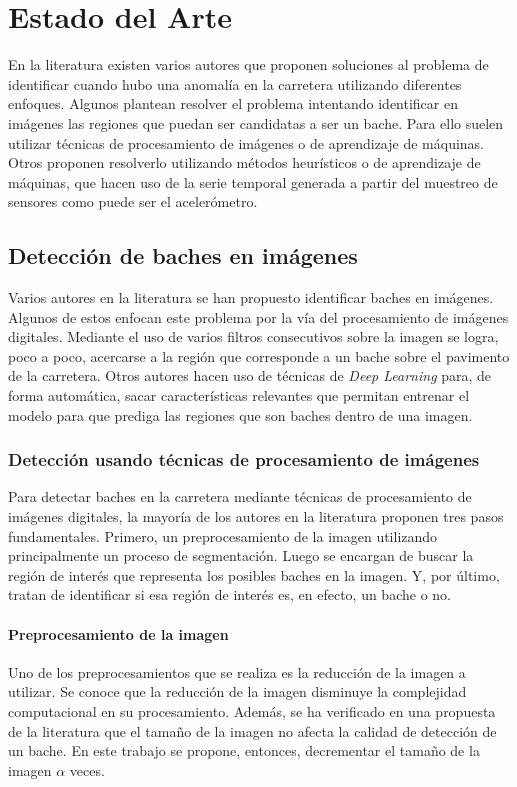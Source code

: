 \chapter{Estado del Arte}\label{chapter:state-of-the-art}
En la literatura existen varios autores que proponen soluciones al problema de identificar cuando hubo una anomalía en la carretera utilizando
diferentes enfoques. Algunos plantean resolver el problema intentando identificar en imágenes las regiones que puedan ser candidatas a ser un 
bache. Para ello suelen utilizar técnicas de procesamiento de imágenes o de aprendizaje de máquinas. Otros proponen resolverlo utilizando métodos 
heurísticos o de aprendizaje de máquinas, que hacen uso de la serie temporal generada a partir del muestreo de sensores como puede ser el acelerómetro. 

\section{Detección de baches en imágenes}
Varios autores en la literatura se han propuesto identificar baches en imágenes. Algunos de estos enfocan este problema por la vía del
procesamiento de imágenes digitales. Mediante el uso de varios filtros consecutivos  sobre la imagen se logra, poco a poco, acercarse 
a la región que corresponde a un bache sobre el pavimento de la carretera.  Otros autores hacen uso de técnicas de \emph{Deep Learning}
para, de forma automática, sacar características relevantes que permitan entrenar el modelo para que prediga las regiones 
que son baches dentro de una imagen.

	\subsection{Detección usando técnicas de procesamiento de imágenes}

		Para detectar baches en la carretera mediante técnicas de procesamiento de imágenes digitales, la mayoría de los autores  en la literatura 
		proponen tres pasos fundamentales. Primero, un preprocesamiento de la imagen utilizando principalmente un proceso de segmentación. Luego 
		se encargan de buscar la región de interés que representa los posibles baches en la imagen. Y, por último, tratan de identificar si esa 
		región de interés es, en efecto, un bache o no. 
		
		\subsubsection{Preprocesamiento de la imagen}
		Uno de los preprocesamientos que se realiza es la reducción de la imagen a utilizar. Se conoce que la reducción de la imagen  disminuye 
		la complejidad computacional en su procesamiento. Además, se ha verificado en una propuesta de la literatura 
		que el tamaño de la imagen no afecta la calidad de detección de un bache.  En este trabajo se propone, entonces, 
		decrementar el tamaño de la imagen $\alpha$ veces.

